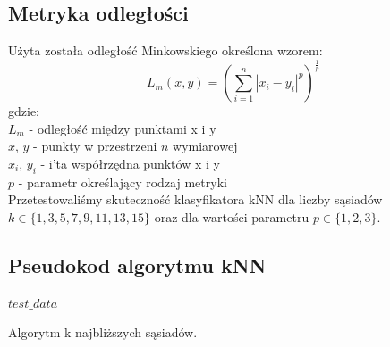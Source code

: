\documentclass[12pt,a4paper]{article}
\begin{document}
\subsection{Metryka odległości}
Użyta została odległość Minkowskiego określona wzorem:
\[
	L_m(x, y) = \left(\sum_{i = 1}^{n} |x_i - y_i|^p\right)^\frac{1}{p}
\]
gdzie: \\
\indent $L_m$ - odległość między punktami x i y\\
\indent $x$, $y$ - punkty w przestrzeni $n$ wymiarowej\\
\indent $x_i$, $y_i$ - i'ta współrzędna punktów x i y\\
\indent $p$ - parametr określający rodzaj metryki\\

\noindent Przetestowaliśmy skuteczność klasyfikatora kNN dla liczby sąsiadów $k \in \{1, 3, 5, 7, 9, 11, 13, 15\}$ oraz
dla wartości parametru $p \in \{1, 2, 3\}$.

\subsection{Pseudokod algorytmu kNN}
\begin{algorithm}[H]
	\Return $test\_data$\;
	\caption{Algorytm k najbliższych sąsiadów.}
\end{algorithm}
\end{document}
